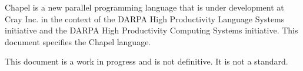 Chapel is a new parallel programming language that is under
development at Cray Inc. in the context of the DARPA High Productivity
Language Systems initiative and the DARPA High Productivity Computing
Systems initiative.  This document specifies the Chapel language.

This document is a work in progress and is not definitive.  It is not
a standard.

